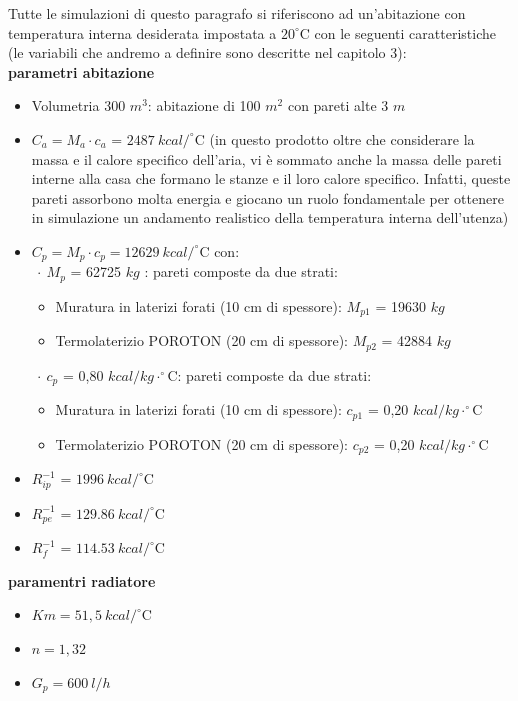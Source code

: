 \documentclass[laurea,oneside,11pt]{USiena_tesiLM}
\begin{document}
Tutte le simulazioni di questo paragrafo si riferiscono ad un'abitazione con temperatura interna desiderata impostata a $20 ^{\circ}$C con le seguenti caratteristiche (le variabili che andremo a definire sono descritte nel capitolo 3):\\
\textbf{parametri abitazione }
\begin{itemize}
\item[] Volumetria 300 $m^3$: abitazione di 100 $m^2$ con pareti alte 3 $m$
\item[] $C_a = M_a \cdot c_a$ = $2487 \ kcal/^{\circ}$C (in questo prodotto oltre che considerare la massa e il calore specifico dell'aria, vi è sommato anche la massa delle pareti interne alla casa che formano le stanze e il loro calore specifico. Infatti, queste pareti assorbono molta energia e giocano un ruolo fondamentale per ottenere in simulazione un andamento realistico della temperatura interna dell'utenza)

\item[] $C_p = M_p \cdot c_p =12629 \ kcal/^{\circ}$C con:\\
 $\ \cdot \ M_p$ = 62725 $kg$ : pareti composte da due strati:
\begin{itemize}
\item[] Muratura in laterizi forati (10 cm di spessore): $M_{p1}$ = 19630 $kg$
\item[] Termolaterizio POROTON (20 cm di spessore): $M_{p2}$ = 42884 $kg$ 
\end{itemize}
$\ \cdot \ c_p$ = 0,80 $kcal/kg \cdot ^{\circ}$C: pareti composte da due strati:
\begin{itemize}
\item[] Muratura in laterizi forati (10 cm di spessore): $c_{p1}$ = 0,20 $kcal/kg \cdot ^{\circ}$C
\item[] Termolaterizio POROTON (20 cm di spessore): $c_{p2}$ = 0,20 $kcal/kg \cdot ^{\circ}$C
\end{itemize}

\item[] $R_{ip}^{-1}$ = $1996 \ kcal/ ^{\circ}$C
\item[] $R_{pe}^{-1}$ = $129.86 \ kcal/ ^{\circ}$C
\item[] $R_{f}^{-1}$ = $114.53 \ kcal/ ^{\circ}$C
\end{itemize}

\textbf{paramentri radiatore}
\begin{itemize}
\item[]$Km = 51,5 \ kcal/^{\circ}$C  
\item[]$n = 1,32$
\item[]$G_p = 600 \ l/h$
\end{itemize}
\end{document}
